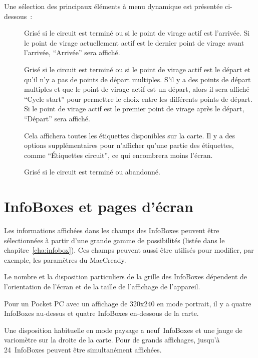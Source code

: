 Une sélection des principaux éléments à menu dynamique est présentée ci-dessous~:
\begin{description}
\item[]  
  Grisé si le circuit est terminé ou si le point de virage actif est
  l'arrivée. Si le point de virage actuellement actif est le dernier point de virage avant
  l'arrivée, ``Arrivée'' sera affiché.
\item[]  
  Grisé si le circuit est terminé ou si le point de virage actif est le
  départ et qu'il n'y a pas de points de départ multiples. S'il y a des points de départ
  multiples et que le point de virage actif est un départ, alors il sera
  affiché ``Cycle start'' pour permettre le choix entre les différents
  points de départ. Si le point de virage actif est le premier point de virage après
  le départ, ``Départ'' sera affiché.
\item[] 
  Cela affichera toutes les étiquettes disponibles sur la carte. Il y a des options supplémentaires pour
  n'afficher qu'une partie des étiquettes, comme ``Étiquettes circuit'', ce qui encombrera moins l'écran.
\item[]  
  Grisé si le circuit est terminé ou abandonné.
\end{description}


\section{InfoBoxes et pages d'écran}\label{sec:infoboxandpages}

Les informations affichées dans les champs des InfoBoxes peuvent être sélectionnées à partir
d'une grande gamme de possibilités (listée dans le chapitre~\ref{cha:infobox}). Ces
champs peuvent aussi être utilisés pour modifier, par exemple, les paramètres du MacCready.

Le nombre et la disposition particuliers de la grille des InfoBoxes dépendent de
l'orientation de l'écran et de la taille de l'affichage de l'appareil.

Pour un Pocket PC avec un affichage de 320x240 en mode portrait, il y a quatre InfoBoxes au-dessus et quatre
InfoBoxes en-dessous de la carte.

Une disposition habituelle en mode paysage a neuf~InfoBoxes et une jauge de variomètre sur la droite de la carte.
Pour de grands affichages, jusqu'à 24~InfoBoxes peuvent être simultanément affichées.  

